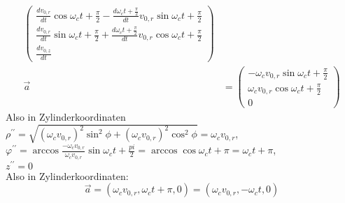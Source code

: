 \documentclass[sectionformat = aufgabe]{gadsescript}
\begin{document}
\begin{enumerate}[label=\alph*)]
\begin{align*}
\begin{pmatrix}
				\frac{d v_{0, r}}{dt} \cos \omega_c t + \frac{\pi}{2} - \frac{d\omega_c t + \frac{\pi}{2}}{dt} v_{0,r} \sin \omega_c t + \frac{\pi}{2}\\
				\frac{d v_{0, r}}{dt} \sin \omega_c t + \frac{\pi}{2} + \frac{d\omega_c t + \frac{\pi}{2}}{dt} v_{0,r} \cos \omega_c t + \frac{\pi}{2}\\
				\frac{d v_{0,z}}{dt}
			\end{pmatrix}\\
			\vec a &= 
			\begin{pmatrix}
				- \omega_c v_{0, r} \sin \omega_c t + \frac{\pi}{2}\\
				\omega_c v_{0, r} \cos \omega_c t + \frac{\pi}{2}\\
				0
			\end{pmatrix}
		\end{align*}
		Also in Zylinderkoordinaten\\
		$ \rho^{\prime\prime} = \sqrt{ \left(\omega_c v_{0, r} \right)^2 \sin^2 \phi + \left(\omega_c v_{0, r} \right)^2 \cos^2 \phi} = \omega_c v_{0, r}$,\\
		$ \varphi^{\prime\prime} = \arccos \frac{-\omega_c v_{0, r}}{\omega_c v_{0, r}} \sin \omega_c t + \frac{pi}{2} = \arccos \cos \omega_c t + \pi = \omega_c t + \pi $, \\
		$ z^{\prime\prime} = 0 $\\
		Also in Zylinderkoordinaten:
		\[ \vec a = \left( \omega_c v_{0, r}, \omega_c t + \pi, 0 \right) = \left( \omega_c v_{0, r}, - \omega_c t, 0 \right) \]
\end{enumerate}
\end{document}
